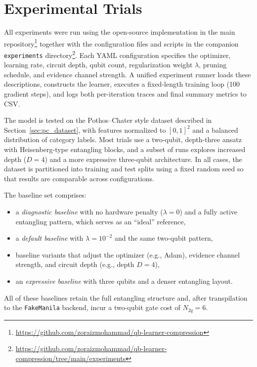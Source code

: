 \documentclass[conference]{IEEEtran}
\begin{document}
\section{Experimental Trials}

All experiments were run using the open-source implementation in the main repository\footnote{\url{https://github.com/zoraizmohammad/qb-learner-compression}} together with the configuration files and scripts in the companion \texttt{experiments} directory\footnote{\url{https://github.com/zoraizmohammad/qb-learner-compression/tree/main/experiments}}. Each YAML configuration specifies the optimizer, learning rate, circuit depth, qubit count, regularization weight $\lambda$, pruning schedule, and evidence channel strength. A unified experiment runner loads these descriptions, constructs the learner, executes a fixed-length training loop (100 gradient steps), and logs both per-iteration traces and final summary metrics to CSV.

The model is tested on the Pothos--Chater style dataset described in Section~\ref{sec:pc_dataset}, with features normalized to $[0,1]^2$ and a balanced distribution of category labels. Most trials use a two-qubit, depth-three ansatz with Heisenberg-type entangling blocks, and a subset of runs explores increased depth ($D=4$) and a more expressive three-qubit architecture. In all cases, the dataset is partitioned into training and test splits using a fixed random seed so that results are comparable across configurations.

The baseline set comprises:
\begin{itemize}
    \item a \emph{diagnostic baseline} with no hardware penalty ($\lambda = 0$) and a fully active entangling pattern, which serves as an ``ideal'' reference,
    \item a \emph{default baseline} with $\lambda = 10^{-2}$ and the same two-qubit pattern,
    \item baseline variants that adjust the optimizer (e.g., Adam), evidence channel strength, and circuit depth (e.g., depth $D=4$),
    \item an \emph{expressive baseline} with three qubits and a denser entangling layout.
\end{itemize}
All of these baselines retain the full entangling structure and, after transpilation to the \texttt{FakeManila} backend, incur a two-qubit gate cost of $N_{2q} = 6$.
\end{document}
